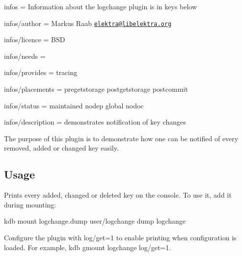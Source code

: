 
\begin{DoxyItemize}
\item infos = Information about the logchange plugin is in keys below
\item infos/author = Markus Raab \href{mailto:elektra@libelektra.org}{\tt elektra@libelektra.\+org}
\item infos/licence = B\+SD
\item infos/needs =
\item infos/provides = tracing
\item infos/placements = pregetstorage postgetstorage postcommit
\item infos/status = maintained nodep global nodoc
\item infos/description = demonstrates notification of key changes
\end{DoxyItemize}

The purpose of this plugin is to demonstrate how one can be notified of every removed, added or changed key easily.

\subsection*{Usage}

Prints every added, changed or deleted key on the console. To use it, add it during mounting\+: \begin{DoxyVerb}kdb mount logchange.dump user/logchange dump logchange
\end{DoxyVerb}


Configure the plugin with {\ttfamily log/get=1} to enable printing when configuration is loaded. For example, {\ttfamily kdb gmount logchange log/get=1}. 